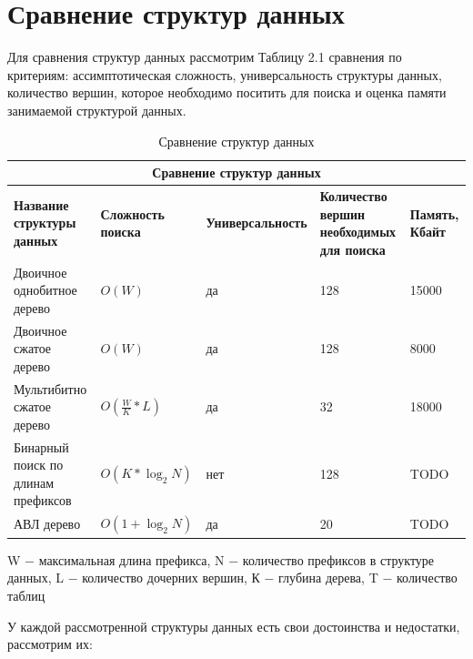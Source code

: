 \documentclass[a4peper, 12pt, titlepage, finall]{report}
\begin{document}
    \section{Сравнение структур данных}
        Для сравнения структур данных рассмотрим Таблицу 2.1 сравнения по критериям: ассимптотическая сложность, универсальность структуры данных,
        количество вершин, которое необходимо поситить для поиска и оценка памяти занимаемой структурой данных. 
        \begin{table}[ht]
            \begin{tabular}{|m{3cm}|m{2.5cm}|m{3.5cm}|m{4cm}|m{3.2cm}|}
                \hline
                \multicolumn{5}{|c|}{Сравнение структур данных}\\
                \hline
                \bf Название структуры данных     & \bf Сложность поиска & \bf Универсальность & \bf Количество вершин необходимых для поиска & \bf Память, Кбайт \\
                \hline
                Двоичное однобитное дерево & $O(W)$ & да & 128 & 15000 \\
                \hline
                Двоичное сжатое дерево & $O(W)$ & да & 128 & 8000 \\
                \hline
                Мультибитно сжатое дерево & $O(\frac{W}{K}*L)$ & да & 32 & 18000 \\
                \hline
                Бинарный поиск по длинам префиксов & $O(K*\log_2{N})$ & нет & 128 & {\ttfamily TODO} \\
                \hline
                АВЛ дерево & $O(1 + \log_2{N})$ & да & 20 & {\ttfamily TODO} \\
                \hline
            \end{tabular}
            \caption{Сравнение структур данных}
            {\ttfamily W $-$ максимальная длина префикса, N $-$ количество префиксов в структуре данных, L $-$ количество дочерних вершин, К $-$ глубина дерева, T $-$ количество таблиц}
        \end{table}
        У каждой рассмотренной структуры данных есть свои достоинства и недостатки, рассмотрим их:
\end{document}
